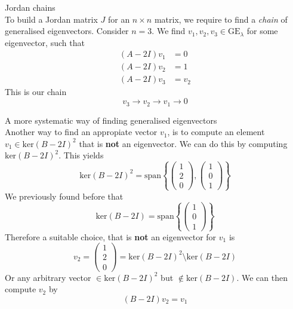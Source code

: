 \documentclass[journal, letterpaper]{IEEEtran}
\begin{document}
    \begin{mybox}{Jordan chains} \\ 
        To build a Jordan matrix $J$ for an $n\times n$ matrix, we require to find a \textit{chain} of generalised eigenvectors. Consider $n = 3$. We find $v_1, v_2, v_3 \in \text{GE}_\lambda$ for some eigenvector, such that
        \begin{align*}
        (A - 2I)v_1 &= 0 \\
        (A - 2I)v_2 &= 1 \\ 
        (A - 2I)v_3 &= v_2
        \end{align*}
        This is our chain
        $$ v_3 \rightarrow v_2 \rightarrow v_1 \rightarrow 0$$
    \end{mybox}
    \begin{myboxr}{A more systematic way of finding generalised eigenvectors} \\
    Another way to find an appropiate vector $v_1$, is to compute an element
    $v_1 \in \text{ker}(B - 2I)^2$ that is \textbf{not} an eigenvector. We can 
    do this by computing $\text{ker}(B - 2I)^2$.
    This yields 
    $$ \text{ker}(B - 2I)^2 = \text{span}\left\{\begin{pmatrix}
    1 \\ 2 \\ 0
    \end{pmatrix}, \begin{pmatrix}
    1 \\ 0 \\ 1
    \end{pmatrix} \right\}$$
    We previously found before that
    $$ \text{ker}(B - 2I) = \text{span}\left\{\begin{pmatrix}
    1 \\ 0 \\ 1
    \end{pmatrix} \right\}$$
    Therefore a suitable choice, that is \textbf{not} an eigenvector for $v_1$ is
    $$ v_2 = \begin{pmatrix}
        1 \\ 2\\ 0
    \end{pmatrix} = \text{ker}(B - 2I)^2 \setminus \text{ker}(B-2I)$$
    Or any arbitrary vector $\in \text{ker}(B - 2I)^2$ but $\notin \text{ker}(B-2I)$. We can then compute $v_2$ by
    $$ (B - 2I)v_2 = v_1$$
    \end{myboxr}\
\end{document}
